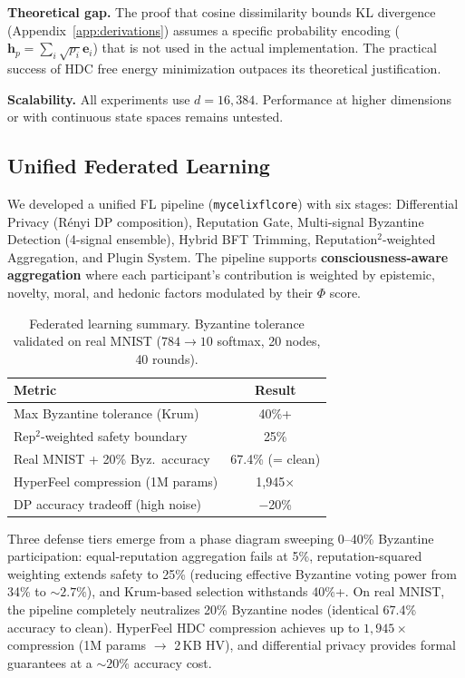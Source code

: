 \documentclass[10pt,letterpaper]{article}
\renewcommand{\Phi}{\varPhi}
\begin{document}
\textbf{Theoretical gap.} The proof that cosine dissimilarity bounds KL divergence (Appendix~\ref{app:derivations}) assumes a specific probability encoding ($\mathbf{h}_p = \sum_i \sqrt{p_i} \mathbf{e}_i$) that is not used in the actual implementation. The practical success of HDC free energy minimization outpaces its theoretical justification.

\textbf{Scalability.} All experiments use $d = 16{,}384$. Performance at higher dimensions or with continuous state spaces remains untested.

\subsection{Unified Federated Learning}
\label{sec:fl}

We developed a unified FL pipeline (\texttt{mycelix\-fl\-core}) with six stages: Differential Privacy (R\'{e}nyi DP composition), Reputation Gate, Multi-signal Byzantine Detection (4-signal ensemble), Hybrid BFT Trimming, Reputation$^2$-weighted Aggregation, and Plugin System. The pipeline supports \textbf{consciousness-aware aggregation} where each participant's contribution is weighted by epistemic, novelty, moral, and hedonic factors modulated by their $\Phi$ score.

\begin{table}[ht]
\centering
\caption{Federated learning summary. Byzantine tolerance validated on real MNIST ($784 \to 10$ softmax, 20 nodes, 40 rounds).}
\label{tab:fl-summary}
\small
\begin{tabular}{@{}lc@{}}
\toprule
Metric & Result \\
\midrule
Max Byzantine tolerance (Krum) & 40\%+ \\
Rep$^2$-weighted safety boundary & 25\% \\
Real MNIST + 20\% Byz.\ accuracy & 67.4\% (= clean) \\
HyperFeel compression (1M params) & 1,945$\times$ \\
DP accuracy tradeoff (high noise) & $-$20\% \\
\bottomrule
\end{tabular}
\end{table}

Three defense tiers emerge from a phase diagram sweeping 0--40\% Byzantine participation: equal-reputation aggregation fails at 5\%, reputation-squared weighting extends safety to 25\% (reducing effective Byzantine voting power from 34\% to ${\sim}2.7\%$), and Krum-based selection withstands 40\%+. On real MNIST, the pipeline completely neutralizes 20\% Byzantine nodes (identical 67.4\% accuracy to clean). HyperFeel HDC compression achieves up to $1{,}945{\times}$ compression (1M params $\to$ 2\,KB HV), and differential privacy provides formal guarantees at a ${\sim}20\%$ accuracy cost.
\end{document}
